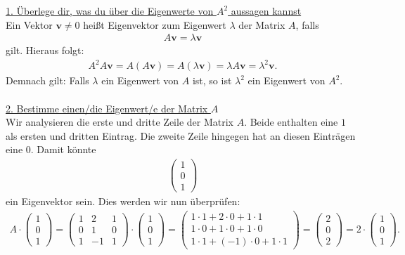 \underline{1. Überlege dir, was du über die Eigenwerte von $ A^2 $ aussagen kannst}\\
Ein Vektor $ \textbf{v} \neq 0 $ heißt Eigenvektor zum Eigenwert $ \lambda $ der Matrix $ A $, falls
\begin{align*}
A\textbf{v} = \lambda \textbf{v} 
\end{align*}
gilt.
Hieraus folgt:
\begin{align*}
A^2 A \textbf{v} = A (A \textbf{v}) = A (\lambda  \textbf{v})
= \lambda A  \textbf{v} = 
\lambda^2 \textbf{v}.
\end{align*}
Demnach gilt: Falls $ \lambda $ ein Eigenwert von $ A $ ist, so ist $ \lambda^2 $ ein Eigenwert von $ A^2 $.\\
\\
\underline{2. Bestimme einen/die Eigenwert/e der Matrix $ A $}\\
Wir analysieren die erste und dritte Zeile der Matrix $ A $.
Beide enthalten eine $ 1 $ als ersten und dritten Eintrag.
Die zweite Zeile hingegen hat an diesen Einträgen eine $ 0 $. Damit könnte
\begin{align*}
\begin{pmatrix}
1 \\ 0 \\ 1
\end{pmatrix}
\end{align*}
ein Eigenvektor sein. Dies werden wir nun überprüfen:
\begin{align*}
A \cdot \begin{pmatrix}
1 \\ 0 \\ 1
\end{pmatrix}
=
\begin{pmatrix}
1 & 2 & 1\\
0 & 1 & 0\\
1 & -1 & 1
\end{pmatrix}
\cdot 
\begin{pmatrix}
1 \\ 0 \\ 1
\end{pmatrix}
=
\begin{pmatrix}
1 \cdot 1 + 2 \cdot 0 + 1 \cdot 1\\
1 \cdot 0  +  1 \cdot 0 +  1 \cdot 0\\
1 \cdot 1 + (-1) \cdot 0 + 1 \cdot 1
\end{pmatrix}
= 
\begin{pmatrix}
2 \\ 0 \\ 2
\end{pmatrix}
= 2 \cdot \begin{pmatrix}
1 \\ 0 \\ 1
\end{pmatrix}.
\end{align*}
